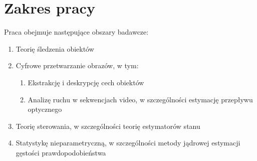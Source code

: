 \section{Zakres pracy}
\label{sec:Zakres_pracy}

Praca obejmuje następujące obszary badawcze:

\begin{enumerate}

	\item Teorię śledzenia obiektów
	\item Cyfrowe przetwarzanie obrazów, w tym:
	
	\begin{enumerate}
	
		\item Ekstrakcję i deskrypcję cech obiektów
		\item Analizę ruchu w sekwencjach video, w szczególności estymację przepływu optycznego
		
	\end{enumerate}		
	
	\item Teorię sterowania, w szczególności teorię estymatorów stanu
	\item Statystykę nieparametryczną, w szczególności metody jądrowej estymacji gęstości prawdopodobieństwa
	

\end{enumerate}